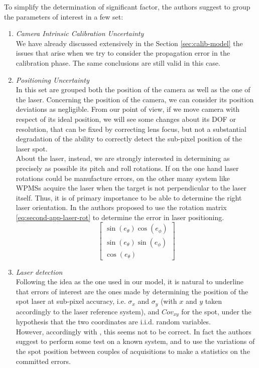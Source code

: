 To simplify the determination of significant factor, the authors suggest to group the parameters of interest in a few set:
  \begin{enumerate}
    \item \textit{Camera Intrinsic Calibration Uncertainty} \\
    We have already discussed extensively in the Section \ref{sec:calib-model} the issues that arise when we try to consider the propagation error in the calibration phase. The same conclusions are still valid in this case.
    
  \item \textit{Positioning Uncertainty} \\
  In this set are grouped both the position of the camera as well as the one of the laser. Concerning the position of the camera, we can consider its position deviations as negligible. From our point of view, if we move camera with respect of its ideal position, we will see some changes about its \acs{DOF} or resolution, that can be fixed by correcting lens focus, but not a substantial degradation of the ability to correctly detect the sub-pixel position of the laser spot.  \\
  About the laser, instead, we are strongly interested in determining as precisely as possible its pitch and roll rotations. If on the one hand laser rotations could be manufacture errors, on the other many system like \acs{WPMS}s acquire the laser when the target is not perpendicular to the laser itself. Thus, it is of primary importance to be able to determine the right laser orientation. In \cite{7520324} the authors proposed to use the rotation matrix \ref{eq:second-app-laser-rot} to determine the error in laser positioning.
  \begin{equation}
      \begin{bmatrix}
          \sin(e_\theta)\cos(e_\phi) \\ \sin(e_\theta)\sin(e_\phi) \\ \cos(e_\theta)
      \end{bmatrix}
      \label{eq:second-app-laser-rot}
   \end{equation}
    
    \item \textit{Laser detection} \\
    Following the idea as the one used in our model, it is natural to underline that errors of interest are the ones made by determining the position of the spot laser at sub-pixel accuracy, i.e. $\sigma_{x}$ and $\sigma_{y}$ (with $x$ and $y$ taken accordingly to the laser reference system), and $Cov_{xy}$ for the spot, under the hypothesis that the two coordinates are i.i.d. random variables. \\
    However, accordingly with \cite{7520324}, this seems not to be correct. In fact the authors suggest to perform some test on a known system, and to use the variations of the spot position between couples of acquisitions to make a statistics on the committed errors.
    

\end{enumerate}
